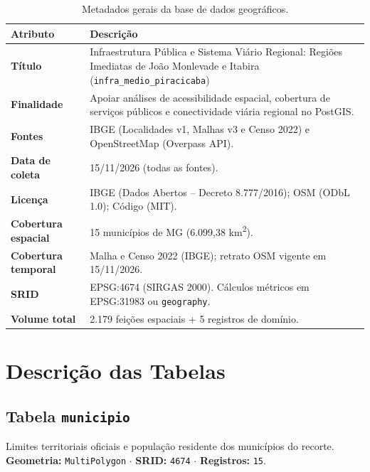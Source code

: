\documentclass[
    12pt,
    oneside,
    a4paper,
    chapter=TITLE,
    section=TITLE,
    brazil
]{abntex2}
\begin{document}
\begin{table}[H]
\centering
\caption{Metadados gerais da base de dados geográficos.}
\label{tab:visao_geral}
\small
\begin{tabularx}{\textwidth}{>{\bfseries}p{4.0cm} X}
\toprule
Atributo & Descrição \\
\midrule
Título & Infraestrutura Pública e Sistema Viário Regional: Regiões Imediatas de João Monlevade e Itabira (\texttt{infra\_medio\_piracicaba}) \\
Finalidade & Apoiar análises de acessibilidade espacial, cobertura de serviços públicos e conectividade viária regional no PostGIS. \\
Fontes & IBGE (Localidades v1, Malhas v3 e Censo 2022) e OpenStreetMap (Overpass API). \\
Data de coleta & 15/11/2026 (todas as fontes). \\
Licença & IBGE (Dados Abertos -- Decreto 8.777/2016); OSM (ODbL 1.0); Código (MIT). \\
Cobertura espacial & 15 municípios de MG (6.099,38 km\textsuperscript{2}). \\
Cobertura temporal & Malha e Censo 2022 (IBGE); retrato OSM vigente em 15/11/2026. \\
SRID & EPSG:4674 (SIRGAS 2000). Cálculos métricos em EPSG:31983 ou \texttt{geography}. \\
Volume total & 2.179 feições espaciais + 5 registros de domínio. \\
\bottomrule
\end{tabularx}
\end{table}

\section{Descrição das Tabelas}

\subsection{Tabela \texttt{municipio}}
Limites territoriais oficiais e população residente dos municípios do recorte. \textbf{Geometria:} \texttt{MultiPolygon} $\cdot$ \textbf{SRID:} \texttt{4674} $\cdot$ \textbf{Registros:} \texttt{15}.
\end{document}
